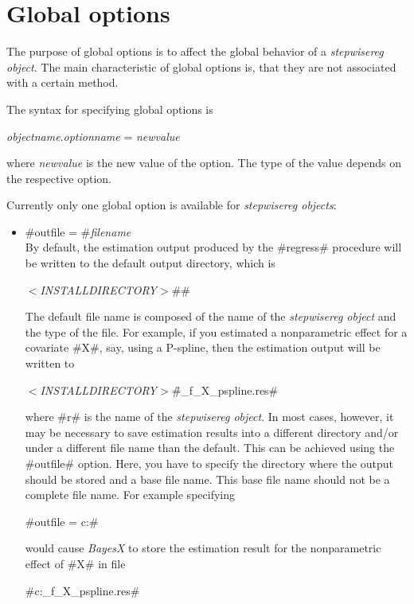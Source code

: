 \section{Global options}
\label{stepwiseregglobopt} 

The purpose of global options is to affect the global behavior of
a {\em stepwisereg object}. The main characteristic of global options
is, that they are not associated with a certain method.

The syntax for specifying global options is

{\em objectname}.{\em optionname} = {\em newvalue}

where {\em newvalue} is the new value of the option. The type of
the value depends on the respective option.

Currently only one global option is available for {\em stepwisereg
objects}:

\begin{itemize}
\item #outfile = #{\em filename} \\
By default, the estimation output produced by the #regress#
procedure will be written to the default output directory, which
is

{\em$<$INSTALLDIRECTORY$>$}#\output#

The default file name is composed of the name of the {\em stepwisereg
object} and the type of the file. For example, if you estimated a
nonparametric effect for a covariate #X#, say, using a P-spline,
then the estimation output will be written to

{\em$<$INSTALLDIRECTORY$>$}#\output\r_f_X_pspline.res#

where #r# is the name of the {\em stepwisereg object}. In most cases,
however, it may be necessary to save estimation results into a
different directory and/or under a different file name than the
default. This can be achieved using the #outfile# option. Here, you
have to specify the directory where the output should be stored and
a base file name. This base file name should not be a complete file
name. For example specifying

#outfile = c:\data{}#

would cause {\em BayesX} to store the estimation result for the
nonparametric effect of #X# in file

#c:\data{}_f_X_pspline.res#
\end{itemize}



